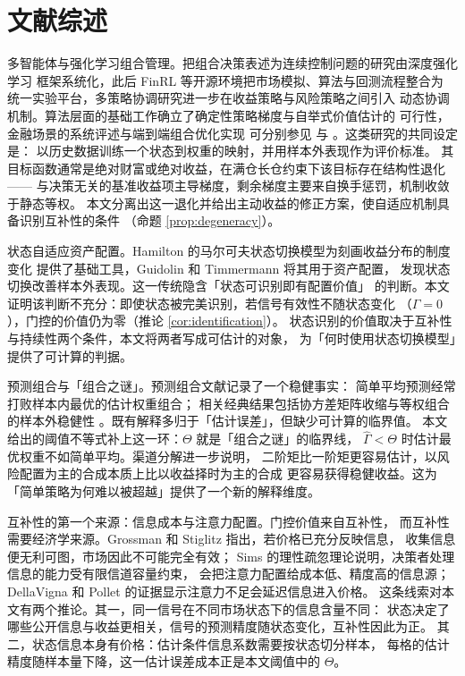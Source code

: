 \section{文献综述}
\label{sec:lit}

多智能体与强化学习组合管理。把组合决策表述为连续控制问题的研究由深度强化学习
框架系统化\cite{jiang2017}，此后 FinRL 等开源环境把市场模拟、算法与回测流程整合为
统一实验平台\cite{liu2020}，多策略协调研究进一步在收益策略与风险策略之间引入
动态协调机制\cite{li2024}。算法层面的基础工作确立了确定性策略梯度与自举式价值估计的
可行性\cite{mnih2015,lillicrap2016,sutton2018}，金融场景的系统评述与端到端组合优化实现
可分别参见 \cite{charpentier2023} 与 \cite{cong2021}。这类研究的共同设定是：
以历史数据训练一个状态到权重的映射，并用样本外表现作为评价标准。
其目标函数通常是绝对财富或绝对收益，在满仓长仓约束下该目标存在结构性退化——
与决策无关的基准收益项主导梯度，剩余梯度主要来自换手惩罚，机制收敛于静态等权。
本文分离出这一退化并给出主动收益的修正方案，使自适应机制具备识别互补性的条件
（命题 \ref{prop:degeneracy}）。

状态自适应资产配置。Hamilton 的马尔可夫状态切换模型为刻画收益分布的制度变化
提供了基础工具\cite{hamilton1989}，Guidolin 和 Timmermann 将其用于资产配置，
发现状态切换改善样本外表现\cite{guidolin2007}。这一传统隐含「状态可识别即有配置价值」
的判断。本文证明该判断不充分：即使状态被完美识别，若信号有效性不随状态变化
（$\Gamma=0$），门控的价值仍为零（推论 \ref{cor:identification}）。
状态识别的价值取决于互补性与持续性两个条件，本文将两者写成可估计的对象，
为「何时使用状态切换模型」提供了可计算的判据。

预测组合与「组合之谜」。预测组合文献记录了一个稳健事实：
简单平均预测经常打败样本内最优的估计权重组合\cite{timmermann2006}；
相关经典结果包括协方差矩阵收缩\cite{ledoit2004}与等权组合的样本外稳健性
\cite{demiguel2009}。既有解释多归于「估计误差」，但缺少可计算的临界值。
本文给出的阈值不等式补上这一环：$\Theta$ 就是「组合之谜」的临界线，
$\hat\Gamma<\Theta$ 时估计最优权重不如简单平均。渠道分解进一步说明，
二阶矩比一阶矩更容易估计，以风险配置为主的合成本质上比以收益择时为主的合成
更容易获得稳健收益。这为「简单策略为何难以被超越」提供了一个新的解释维度。

互补性的第一个来源：信息成本与注意力配置。门控价值来自互补性，
而互补性需要经济学来源。Grossman 和 Stiglitz 指出，若价格已充分反映信息，
收集信息便无利可图，市场因此不可能完全有效\cite{grossman1980}；
Sims 的理性疏忽理论说明，决策者处理信息的能力受有限信道容量约束，
会把注意力配置给成本低、精度高的信息源\cite{sims2003}；
DellaVigna 和 Pollet 的证据显示注意力不足会延迟信息进入价格\cite{dellavigna2009}。
这条线索对本文有两个推论。其一，同一信号在不同市场状态下的信息含量不同：
状态决定了哪些公开信息与收益更相关，信号的预测精度随状态变化，互补性因此为正。
其二，状态信息本身有价格：估计条件信息系数需要按状态切分样本，
每格的估计精度随样本量下降，这一估计误差成本正是本文阈值中的 $\Theta$。

